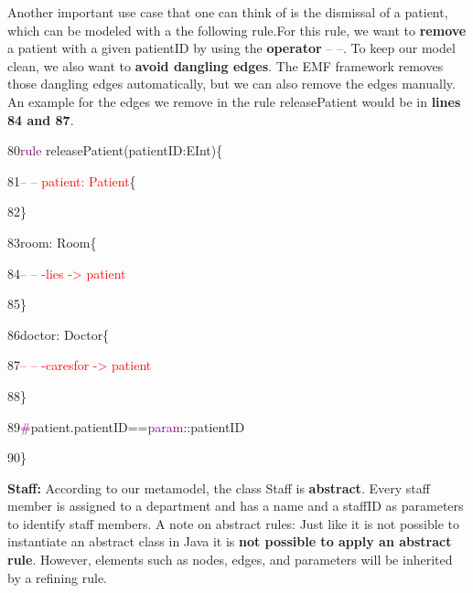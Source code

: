 Another important use case that one can think of is the dismissal of a patient, which can be modeled with a the following rule.\newline For this rule, we want to \textbf{remove} a patient with a given \textsf{patientID} by using the \textbf{operator} \textcolor{red}{-- --}.\newline
To keep our model clean, we also want to \textbf{avoid dangling edges}. The EMF framework removes those dangling edges automatically, but we can also remove the edges manually.
An example for the edges we remove in the rule \textsf{releasePatient} would be in \textbf{lines 84 and 87}.\newline\newline

{

80\hspace{0.5cm}\textcolor{Purple}{rule} releasePatient(patientID:EInt)\{

81\hspace{1cm}\textcolor{red}{-- -- patient: Patient}\{

82\hspace{1cm}\}

83\hspace{1cm}room: Room\{

84\hspace{1.5cm}\textcolor{red}{-- -- -lies -> patient}

85\hspace{1cm}\}

86\hspace{1cm}doctor: Doctor\{

87\hspace{1.5cm}\textcolor{red}{-- -- -caresfor -> patient}

88\hspace{1cm}\}

89\hspace{1cm}\textcolor{Purple}{\#}patient.patientID==\textcolor{Purple}{param}::patientID

90\hspace{0.5cm}\}\newline\newline

}

\clearpage

\textbf{Staff:}\newline
According to our metamodel, the class Staff is \textbf{abstract}. Every staff member is assigned to a department and has a name and a staffID as parameters to identify staff members. \newline
A note on abstract rules: Just like it is not possible to instantiate an abstract class in Java it is \textbf{not possible to apply an abstract rule}. However, elements such as nodes, edges, and parameters will be inherited by a refining rule.\newline\newline

